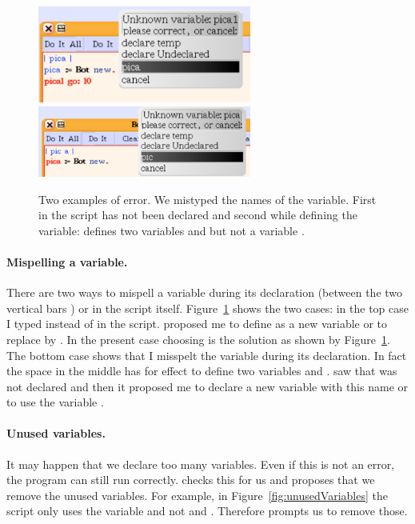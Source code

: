 \begin{figure}[h]
\begin{center}\includegraphics[width=7cm]{mispellVariable}
\includegraphics[width=7cm]{unknowVariable}
\caption{Two examples of error. We mistyped the names of the variable. First in the script  has not been declared and second while defining the variable:  defines two variables  and  but not a variable . \label{fig:wrongVar}}\end{center}
\end{figure} 

\paragraph{Mispelling a variable.} There are two ways to mispell a variable during its declaration (between the two vertical bars \ct{|}) or in the script itself. Figure~\ref{fig:wrongVar} shows the two cases: in the top case I typed  instead of  in the script. \sq proposed me to define  as a new variable or to replace  by . In the present case choosing  is the solution as shown by Figure~\ref{fig:wrongVar}. The bottom case shows that I misspelt the variable  during its declaration. In fact the space in the middle has for effect to define two variables  and . \sq saw that  was not declared and then it proposed me to declare a new variable with this name or to use the variable .


\paragraph{Unused variables.} It may happen that we declare too many variables. Even if this is not an error, \ie the program can still run correctly. \sq checks this for us and proposes that we remove the unused variables. For example, in Figure~\ref{fig:unusedVariables} the script only uses the variable  and not  and . Therefore \sq prompts us to remove those. 

